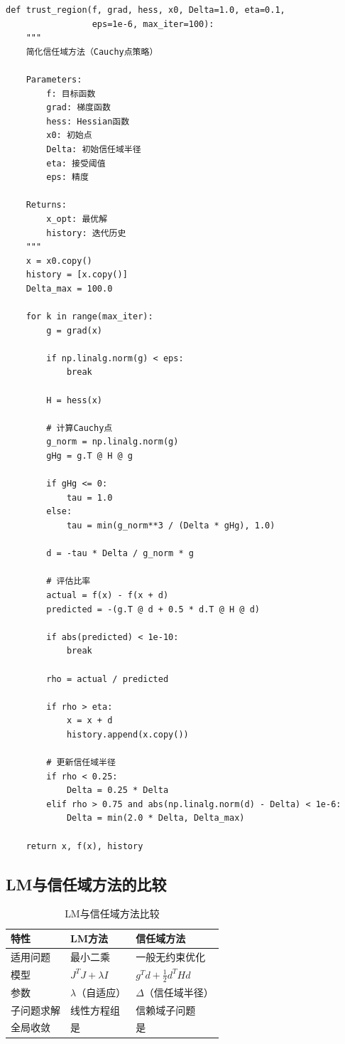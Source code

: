 \begin{codebox}
\begin{lstlisting}
def trust_region(f, grad, hess, x0, Delta=1.0, eta=0.1,
                 eps=1e-6, max_iter=100):
    """
    简化信任域方法（Cauchy点策略）
    
    Parameters:
        f: 目标函数
        grad: 梯度函数
        hess: Hessian函数
        x0: 初始点
        Delta: 初始信任域半径
        eta: 接受阈值
        eps: 精度
    
    Returns:
        x_opt: 最优解
        history: 迭代历史
    """
    x = x0.copy()
    history = [x.copy()]
    Delta_max = 100.0
    
    for k in range(max_iter):
        g = grad(x)
        
        if np.linalg.norm(g) < eps:
            break
        
        H = hess(x)
        
        # 计算Cauchy点
        g_norm = np.linalg.norm(g)
        gHg = g.T @ H @ g
        
        if gHg <= 0:
            tau = 1.0
        else:
            tau = min(g_norm**3 / (Delta * gHg), 1.0)
        
        d = -tau * Delta / g_norm * g
        
        # 评估比率
        actual = f(x) - f(x + d)
        predicted = -(g.T @ d + 0.5 * d.T @ H @ d)
        
        if abs(predicted) < 1e-10:
            break
            
        rho = actual / predicted
        
        if rho > eta:
            x = x + d
            history.append(x.copy())
        
        # 更新信任域半径
        if rho < 0.25:
            Delta = 0.25 * Delta
        elif rho > 0.75 and abs(np.linalg.norm(d) - Delta) < 1e-6:
            Delta = min(2.0 * Delta, Delta_max)
    
    return x, f(x), history
\end{lstlisting}
\end{codebox}

\subsection{LM与信任域方法的比较}

\begin{table}[H]
\centering
\caption{LM与信任域方法比较}
\begin{tabular}{@{}lll@{}}
\toprule
\textbf{特性} & \textbf{LM方法} & \textbf{信任域方法} \\
\midrule
适用问题 & 最小二乘 & 一般无约束优化 \\
模型 & $J^T J + \lambda I$ & $g^T d + \frac{1}{2}d^T H d$ \\
参数 & $\lambda$（自适应） & $\Delta$（信任域半径） \\
子问题求解 & 线性方程组 & 信赖域子问题 \\
全局收敛 & 是 & 是 \\
\bottomrule
\end{tabular}
\end{table}

